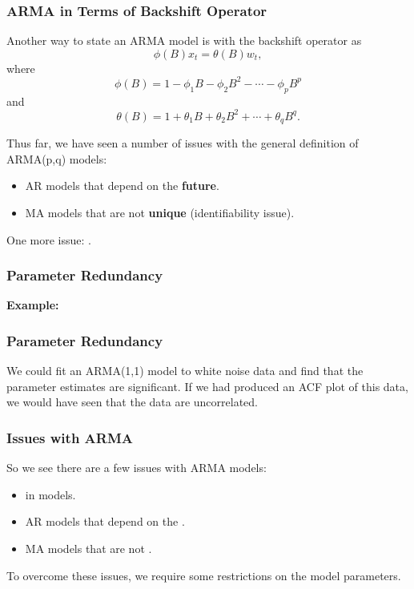 \documentclass[%
xcolor=pdftex]{beamer}
\begin{document}
\begin{frame}
\frametitle{ARMA in Terms of Backshift Operator}

Another way to state an ARMA model is with the backshift operator as
\begin{equation} \label{eq:arma_op}
\phi(B)x_t=\theta(B) w_t,
\end{equation}
where
$$
\phi(B) = 1-\phi_1 B - \phi_2 B^2 - \cdots - \phi_p B^p
$$
and
$$
\theta(B) = 1+\theta_1 B + \theta_2 B^2 + \cdots + \theta_q B^q.
$$

Thus far, we have seen a number of issues with the general definition of ARMA(p,q) models:

\begin{itemize}
\item AR models that depend on the \textbf{future}.
\item MA models that are not \textbf{unique} (identifiability issue).
\end{itemize}

One more issue: \underline{\hspace{35 mm}}.

\end{frame}

\begin{frame}
\frametitle{Parameter Redundancy}

\textbf{Example:}

\vspace{80mm}


\end{frame}


\begin{frame}
\frametitle{Parameter Redundancy}

We could fit an ARMA(1,1) model to white noise data and find that the parameter estimates are significant. If we had produced an ACF plot of this data, we would have seen that the data are uncorrelated.
\end{frame}

\begin{frame}
\frametitle{Issues with ARMA}

So we see there are a few issues with ARMA models:

\begin{itemize}
\item \underline{\hspace{35 mm}} in models.
\item AR models that depend on the \underline{\hspace{15 mm}}.
\item MA models that are not \underline{\hspace{15 mm}}.
\end{itemize}

To overcome these issues, we require some restrictions on the model parameters.

\end{frame}
\end{document}
